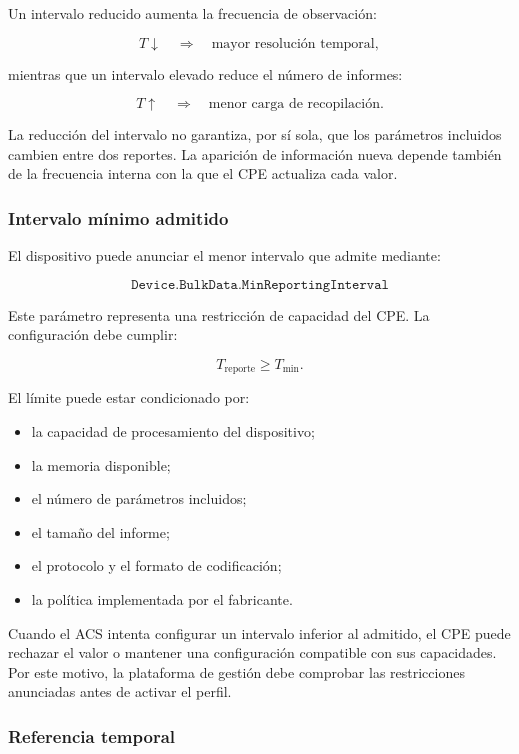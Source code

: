 Un intervalo reducido aumenta la frecuencia de observación:

\[
    T \downarrow
    \quad \Longrightarrow \quad
    \text{mayor resolución temporal},
\]

mientras que un intervalo elevado reduce el número de informes:

\[
    T \uparrow
    \quad \Longrightarrow \quad
    \text{menor carga de recopilación}.
\]

La reducción del intervalo no garantiza, por sí sola, que los parámetros
incluidos cambien entre dos reportes. La aparición de información nueva
depende también de la frecuencia interna con la que el CPE actualiza cada
valor.


\subsubsection*{Intervalo mínimo admitido}

El dispositivo puede anunciar el menor intervalo que admite mediante:

\[
    \texttt{Device.BulkData.MinReportingInterval}
\]

Este parámetro representa una restricción de capacidad del CPE. La
configuración debe cumplir:

\[
    T_{\mathrm{reporte}}
    \geq
    T_{\mathrm{min}}.
\]

El límite puede estar condicionado por:

\begin{itemize}
    \item la capacidad de procesamiento del dispositivo;
    \item la memoria disponible;
    \item el número de parámetros incluidos;
    \item el tamaño del informe;
    \item el protocolo y el formato de codificación;
    \item la política implementada por el fabricante.
\end{itemize}

Cuando el ACS intenta configurar un intervalo inferior al admitido, el
CPE puede rechazar el valor o mantener una configuración compatible con
sus capacidades. Por este motivo, la plataforma de gestión debe comprobar
las restricciones anunciadas antes de activar el perfil.


\subsubsection*{Referencia temporal}

